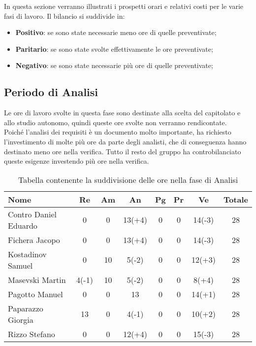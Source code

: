 \documentclass[../piano_di_progetto.tex]{subfiles}
\begin{document}
In questa sezione verranno illustrati i prospetti orari e relativi costi per le varie fasi di lavoro. Il bilancio si suddivide in:
\begin{itemize}
\item \textbf{Positivo}: se sono state necessarie meno ore di quelle preventivate;
\item \textbf{Paritario}: se sono state svolte effettivamente le ore preventivate;
\item \textbf{Negativo}: se sono state necessarie più ore di quelle preventivate;
\end{itemize}

\subsection{ Periodo di Analisi}%
\label{sub:cons_analisi}
Le ore di lavoro svolte in questa fase sono destinate alla scelta del capitolato e allo studio autonomo, quindi queste ore svolte non verranno rendicontate.\\
Poiché l'analisi dei requisiti è un documento molto importante, ha richiesto l'investimento di molte più ore da parte degli analisti, che di conseguenza hanno destinato meno ore nella verifica. 
Tutto il resto del gruppo ha controbilanciato queste esigenze investendo più ore nella verifica.

\begin{table}[!ht]
	\centering
	\begin{tabular}{|l|c|c|c|c|c|c|c|}
	\hline
	\rowcolor{lightgray}
	\textbf{Nome} & \textbf{Re} & \textbf{Am} & \textbf{An} & \textbf{Pg}  & \textbf{Pr}   & \textbf{Ve} & \textbf{Totale}\\
	\hline
		Contro Daniel Eduardo & 0 & 0 & 13(+4) & 0 & 0 & 14(-3) & 28 \\
		Fichera Jacopo & 0 & 0 & 13(+4) & 0 & 0 & 14(-3) & 28 \\
		Kostadinov Samuel & 0 & 10 & 5(-2) & 0 & 0 & 12(+3) & 28 \\		
		Masevski Martin & 4(-1) & 10 & 5(-2) & 0 & 0 & 8(+4) & 28 \\
		Pagotto Manuel & 0 & 0 & 13 & 0 & 0 & 14(+1) & 28 \\			
		Paparazzo Giorgia & 13 & 0 & 4(-1) & 0 & 0 & 10(+2) & 28 \\
		Rizzo Stefano & 0 & 0 & 12(+4) & 0 & 0 & 15(-3) & 28 \\
	\hline	
	\end{tabular}
	\caption{Tabella contenente la suddivisione delle ore nella fase di Analisi}
\end{table}
\end{document}
